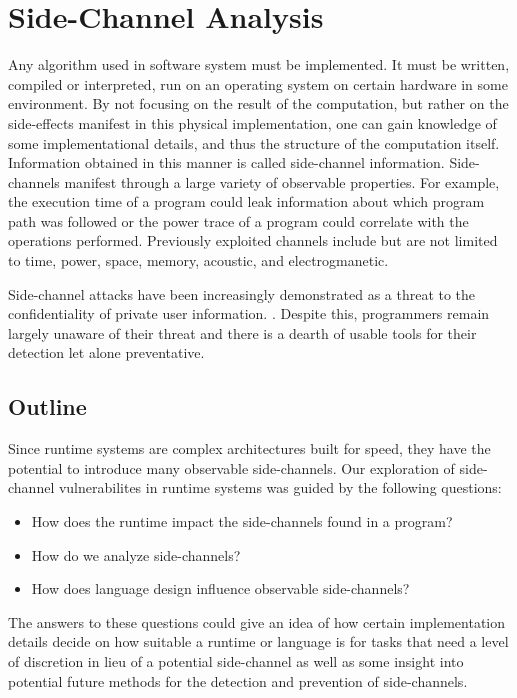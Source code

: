 \section{Side-Channel Analysis}

Any algorithm used in software system must be implemented. It must be written, compiled or interpreted, run on an operating system on certain hardware in some environment. 
By not focusing on the result of the computation, but rather on the side-effects
manifest in this physical implementation, one can gain knowledge of some
implementational details, and thus the structure of the computation itself. Information obtained in this manner is called side-channel information. Side-channels manifest through a large variety of observable properties. For example, the execution time of a program could leak information about which program path was followed or the power trace of a program could correlate with the operations performed. Previously exploited channels include but are not limited to time, power, space, memory, acoustic, and electrogmanetic. 

Side-channel attacks have been increasingly demonstrated as a threat to the confidentiality of private user information. \cite{brumley2005remote, brumley2011remote, hund2013practical, mangard2008power,messerges2000using}. Despite this, programmers remain largely unaware of their threat and there is a dearth of usable tools for their detection let alone preventative. 


\subsection{Outline}
Since runtime systems are complex architectures built for speed, they have the potential to introduce many observable side-channels. Our exploration of side-channel vulnerabilites in runtime systems was guided by the following questions:
\begin{itemize}     
	\item{How does the runtime impact the side-channels found in a program?}
	\item{How do we analyze side-channels?}
	\item{How does language design influence observable side-channels?}
\end{itemize}

The answers to these questions could give an idea of how certain implementation
details decide on how suitable a runtime or language is for tasks that need a level
of discretion in lieu of a potential side-channel as well as some insight into potential future methods for the detection and prevention of side-channels. 